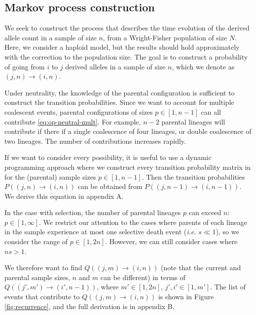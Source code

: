 \documentclass[review]{elsarticle}
\newcommand{\ra}{\rightarrow}
\begin{document}
\subsection{Markov process construction}
\label{subsec:markov}

We seek to construct the process that describes the time evolution of the derived allele count in a
sample of size $n$, from a Wright-Fisher population of size $N$. Here, we consider a haploid model,
but the results should hold approximately with the correction to the population size. The goal is to
construct a probability of going from $i$ to $j$ derived alleles in a sample of size $n$, which we
denote as $(j,n)\ra(i,n)$.

Under neutrality, the knowledge of the parental configuration is sufficient to construct the
transition probabilities. Since we want to account for multiple coalescent events, parental
configurations of sizes $p \in [1, n-1]$ can all contribute \eqref{eq:op-neutral-mult}. For example,
$n-2$ parental lineages will contribute if there if a single coalescence of four lineages, or double
coalescence of two lineages. The number of contributions increases rapidly.

If we want to consider every possibility, it is useful to use a dynamic programming approach where
we construct every transition probability matrix in for the (parental) sample sizes $p \in [1,n-1]$.
Then the transition probabilities $P((j,n)\ra(i,n))$ can be obtained from $P((j,n-1)\ra(i,n-1))$.
We derive this equation in appendix A.

In the case with selection, the number of parental lineages $p$ can exceed $n$: $p\in[1, \infty]$.
We restrict our attention to the cases where parents of each lineage in the sample experience at
most one selective death event (\textit{i.e.} $s \ll 1$), so we consider the range of $p \in [1, 2n]$.
However, we can still consider cases where $ns > 1$.

We therefore want to find $Q((j,m)\ra(i,n))$ (note that the current and parental sample sizes, $n$
and $m$ can be different) in terms of $Q((j',m')\ra(i',n-1))$, where $m' \in [1, 2n]$, $j',i' \in
[1, m']$. The list of events that contribute to $Q((j,m)\ra(i,n))$ is shown in Figure
\ref{fig:recurrence}, and the full derivation is in appendix B.
\end{document}
